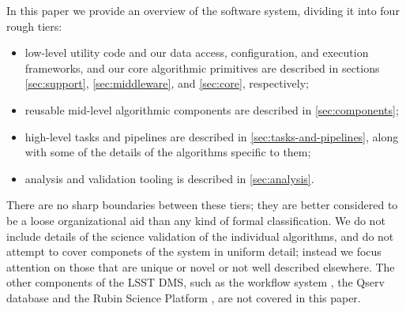 In this paper we provide an overview of the software system, dividing it into four rough tiers:
\begin{itemize}
\item low-level utility code and our data access, configuration, and execution frameworks, and our core algorithmic primitives are described in sections \ref{sec:support}, \ref{sec:middleware}, and \ref{sec:core}, respectively;
\item reusable mid-level algorithmic components are described in \ref{sec:components};
\item high-level tasks and pipelines are described in \ref{sec:tasks-and-pipelines}, along with some of the details of the algorithms specific to them;
\item analysis and validation tooling is described in \ref{sec:analysis}.
\end{itemize}
There are no sharp boundaries between these tiers; they are better considered to be a loose organizational aid than any kind of formal classification.
We do not include details of the science validation of the individual algorithms, and do not attempt to cover componets of the system in uniform detail; instead we focus attention on those that are unique or novel or not well described elsewhere.
The other components of the LSST DMS, such as the workflow system \citep{2022arXiv221115795G,2024EPJWC.29504026K}, the Qserv database \citep{Wang:2011:QDS:2063348.2063364,C15_adassxxxii} and the Rubin Science Platform \citep{LSE-319,2024ASPC..535..227O}, are not covered in this paper.
